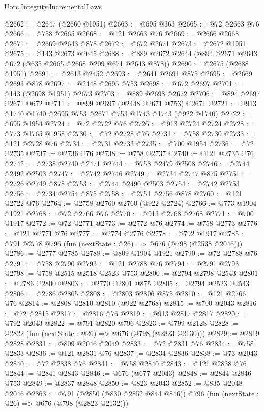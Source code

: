 \begin{lexlean}{Uorc.Integrity.IncrementalLaws}
\begin{coremodule}
@2662 := @2647 (@2660 @1951)
@2663 := @695 @363
@2665 := @72 @2663 @76
@2666 := @758 @2665
@2668 := @121 @2663 @76
@2669 := @2666 @2668
@2671 := @2669 @2643 @878
@2672 := @672 @2671
@2673 := @2672 @1951
@2675 := @143 @2673 @2645
@2688 := @889 @2672 @2644 (@894 @2671 @2643 @672 (@635 @2665 @2668 @209 @671 @2643 @878))
@2690 := @2675 (@2688 @1951)
@2691 := @2613 @2452
@2693 := @2641 @2691 @875
@2695 := @2669 @2693 @878
@2697 := @2448 @2695 @753
@2698 := @672 @2697
@2701 := @143 (@2698 @1951) @2673
@2703 := @889 @2698 @2672
@2706 := @894 @2697 @2671 @672
@2711 := @899 @2697 (@2448 @2671 @753) @2671
@2721 := @913 @1740 @1740 @2695 @753 @2671 @753 @1743 @1743 (@922 @1740)
@2722 := @695 @1954
@2724 := @72 @2722 @76
@2726 := @913 @2724 @2724
@2728 := @773 @1765 @1958
@2730 := @72 @2728 @76
@2731 := @758 @2730
@2733 := @121 @2728 @76
@2734 := @2731 @2733
@2735 := @700 @1954
@2736 := @72 @2735
@2737 := @2736 @76
@2738 := @758 @2737
@2740 := @121 @2735 @76
@2742 := @2738 @2740 @2471
@2744 := @758 @2479 @2508
@2746 := @2744 @2492 @2503
@2747 := @2742 @2746
@2749 := @2734 @2747 @875
@2751 := @2726 @2749 @878
@2753 := @2744 @2490 @2503
@2754 := @2742 @2753
@2756 := @2734 @2754 @875
@2758 := @2751 @2756 @878
@2760 := @121 @2722 @76
@2764 := @2758 @2760 @2760 (@922 @2724)
@2766 := @773 @1904 @1921
@2768 := @72 @2766 @76
@2770 := @913 @2768 @2768
@2771 := @700 @1917
@2772 := @72 @2771
@2773 := @2772 @76
@2774 := @758 @2773
@2776 := @121 @2771 @76
@2777 := @2774 @2776
@2778 := @792 @1917
@2785 := @791 @2778 @796 (fun (nextState : @26) => @676 (@798 (@2538 @2046)))
@2786 := @2777 @2785
@2788 := @809 @1904 @1921
@2790 := @72 @2788 @76
@2791 := @758 @2790
@2793 := @121 @2788 @76
@2794 := @2791 @2793
@2798 := @758 @2515 @2518 @2523 @753
@2800 := @2794 @2798 @2543
@2801 := @2786 @2800
@2803 := @2770 @2801 @875
@2805 := @2794 @2523 @2543
@2806 := @2786 @2805
@2808 := @2803 @2806 @875
@2810 := @121 @2766 @76
@2814 := @2808 @2810 @2810 (@922 @2768)
@2815 := @700 @2043
@2816 := @72 @2815
@2817 := @2816 @76
@2819 := @913 @2817 @2817
@2820 := @792 @2043
@2822 := @791 @2820 @796
@2823 := @799 @2128
@2828 := @2822 (fun (nextState : @26) => @676 (@798 (@2823 @2130)))
@2829 := @2819 @2828
@2831 := @809 @2046 @2049
@2833 := @72 @2831 @76
@2834 := @758 @2833
@2836 := @121 @2831 @76
@2837 := @2834 @2836
@2838 := @73 @2043
@2840 := @72 @2838 @76
@2841 := @758 @2840
@2843 := @121 @2838 @76
@2844 := @2841 @2843
@2846 := @676 (@677 @2043)
@2848 := @2844 @2846 @753
@2849 := @2837 @2848
@2850 := @823 @2043
@2852 := @835 @2048 @2046
@2863 := @791
    (@2850 (@830 @2852 @844 @846))
    @796
    (fun (nextState : @26) => @676 (@798 (@2823 @2132)))

\end{coremodule}
\end{lexlean}
